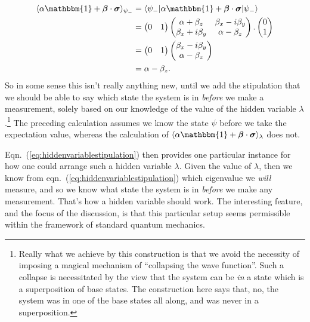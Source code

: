 \documentclass[12pt]{article}
\begin{document}
\begin{displaymath}
  \begin{split}
    \langle \alpha \mathbbm{1} + \bm{\beta} \cdot \bm{\sigma} \rangle_{\psi_{-}}
    &= \langle \psi_{-} | \alpha \mathbbm{1} + \bm{\beta} \cdot \bm{\sigma} | \psi_{-} \rangle \\
    &=
    \begin{pmatrix}
      0 & 1
    \end{pmatrix}
    \begin{pmatrix}
      \alpha + \beta_z & \beta_x - i \beta_y \\
      \beta_x + i \beta_y & \alpha - \beta_z
    \end{pmatrix}.
    \begin{pmatrix}
      0 \\
      1
    \end{pmatrix}
    \\
    &=
    \begin{pmatrix}
      0 & 1
    \end{pmatrix}
    \begin{pmatrix}
      \beta_x - i \beta_y \\
      \alpha - \beta_z
    \end{pmatrix}
    \\
    &= \alpha - \beta_z.
  \end{split}
\end{displaymath}
So in some sense this isn't really anything new, until we add the stipulation that we should be able to say which state the system is in \emph{before} we make a measurement, solely based on our knowledge of the value of the hidden variable $\lambda$.\footnote{Really what we achieve by this construction is that we avoid the necessity of imposing a magical mechanism of ``collapsing the wave function''. Such a collapse is necessitated by the view that the system can be \emph{in} a state which is a superposition of base states. The construction here says that, no, the system was in one of the base states all along, and was never in a superposition.} The preceding calculation assumes we know the state $\psi$ before we take the expectation value, whereas the calculation of $\langle \alpha \mathbbm{1} + \bm{\beta} \cdot \bm{\sigma} \rangle_{\lambda}$ does not.

Eqn.~(\ref{eq:hiddenvariablestipulation}) then provides one particular instance for how one could arrange such a hidden variable $\lambda$. Given the value of $\lambda$, then we know from eqn.~(\ref{eq:hiddenvariablestipulation}) which eigenvalue we \emph{will} measure, and so we know what state the system is in \emph{before} we make any measurement. That's how a hidden variable should work. The interesting feature, and the focus of the discussion, is that this particular setup seems permissible within the framework of standard quantum mechanics.
\end{document}
